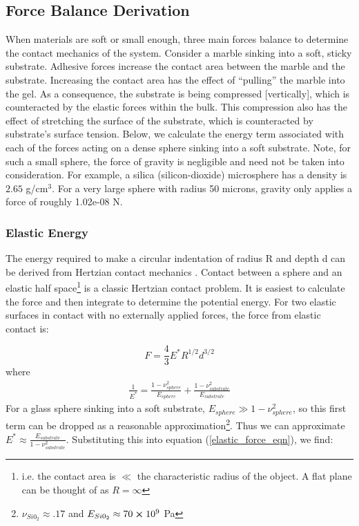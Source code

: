 \subsection{Force Balance Derivation}
When materials are soft or small enough, three main forces balance to determine the contact mechanics of the system. Consider a marble sinking into a soft, sticky substrate. Adhesive forces increase the contact area between the marble and the substrate. Increasing the contact area has the effect of ``pulling'' the marble into the gel. As a consequence, the substrate is being compressed [vertically], which is counteracted by the elastic forces within the bulk. This compression also has the effect of stretching the surface of the substrate, which is counteracted by substrate's surface tension. Below, we calculate the energy term associated with each of the forces acting on a dense sphere sinking into a soft substrate. Note, for such a small sphere, the force of gravity is negligible and need not be taken into consideration. For example, a silica (silicon-dioxide) microsphere has a density is $2.65$ g/cm$^3$. For a very large sphere with radius 50 microns, gravity only applies a force of roughly 1.02e-08 N.

\subsubsection{Elastic Energy}
The energy required to make a circular indentation of radius R and depth d can be derived from Hertzian contact mechanics \cite{hertz1882uber, style2013surface,cao2016nanoparticles}. Contact between a sphere and an elastic half space\footnote{i.e. the contact area is $ \ll $ the characteristic radius of the object. A flat plane can be thought of as $ R = \infty $}   is a classic Hertzian contact problem. It is easiest to calculate the force and then integrate to determine the potential energy. For two elastic surfaces in contact with no externally applied forces, the force from elastic contact is:

\begin{equation}
F = \frac{4}{3}E^*R^{1/2}d^{3/2}
\label{elastic_force_eqn}
\end{equation} 
where 
\begin{align*}
\frac{1}{E^*} = \frac{1-\nu_{sphere}^2}{E_{sphere}} + \frac{1-\nu_{substrate}^2}{E_{substrate}} 
\end{align*}
For a glass sphere sinking into a soft substrate, $ E_{sphere} \gg 1-\nu_{sphere}^2 $, so this first term can be dropped as a reasonable approximation\footnote{$\nu_{Si0_2} \approx .17 $ and $ E_{Si0_2} \approx 70 \cross 10^9 $ Pa}. Thus we can approximate $ E^* \approx \frac{E_{substrate}}{1-\nu_{substrate}^2} $. Substituting this into equation (\ref{elastic_force_eqn}), we find:

